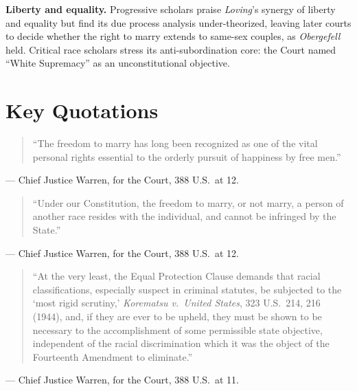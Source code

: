 \documentclass[12pt]{article}
\begin{document}
\textbf{Liberty and equality.} Progressive scholars praise \textit{Loving}'s synergy of liberty and equality but find its due process analysis under-theorized, leaving later courts to decide whether the right to marry extends to same-sex couples, as \textit{Obergefell} held. Critical race scholars stress its anti-subordination core: the Court named ``White Supremacy'' as an unconstitutional objective.

\section{Key Quotations}

\begin{quote}
``The freedom to marry has long been recognized as one of the vital personal rights essential to the orderly pursuit of happiness by free men.''
\end{quote}
\noindent --- Chief Justice Warren, for the Court, 388 U.S.\ at 12.

\begin{quote}
``Under our Constitution, the freedom to marry, or not marry, a person of another race resides with the individual, and cannot be infringed by the State.''
\end{quote}
\noindent --- Chief Justice Warren, for the Court, 388 U.S.\ at 12.

\begin{quote}
``At the very least, the Equal Protection Clause demands that racial classifications, especially suspect in criminal statutes, be subjected to the `most rigid scrutiny,' \textit{Korematsu v.\ United States}, 323 U.S.\ 214, 216 (1944), and, if they are ever to be upheld, they must be shown to be necessary to the accomplishment of some permissible state objective, independent of the racial discrimination which it was the object of the Fourteenth Amendment to eliminate.''
\end{quote}
\noindent --- Chief Justice Warren, for the Court, 388 U.S.\ at 11.
\end{document}
